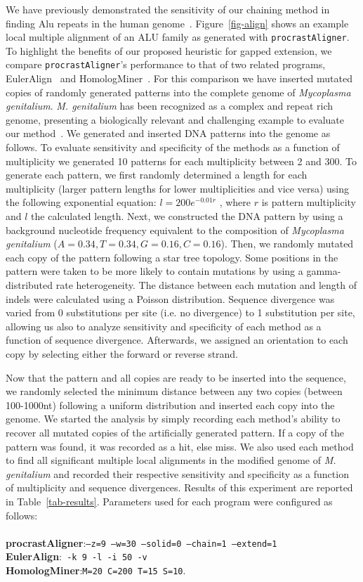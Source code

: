 \documentclass{ws-procs9x6}
\begin{document}
We have previously demonstrated the sensitivity of our chaining method in finding Alu repeats in
the human genome~\cite{ref-procrast}. Figure~\ref{fig-align} shows an example local multiple alignment of an ALU family as generated with \texttt{procrastAligner}. To highlight the benefits of our proposed heuristic for gapped extension, we compare \texttt{procrastAligner}'s performance to that of two related programs, EulerAlign~\cite{ref-related1} and HomologMiner~\cite{ref-homologminer}. For this comparison we have inserted mutated copies of randomly generated patterns into the complete genome of \emph{Mycoplasma genitalium}. \emph{M. genitalium} has been recognized as a complex and repeat rich genome, presenting a biologically relevant and challenging example to evaluate our method~\cite{ref-mycoplasma}. We generated and inserted DNA patterns into the genome as follows. To evaluate sensitivity and specificity of the methods as a function of multiplicity we generated 10 patterns for each multiplicity between 2 and 300. To generate each pattern, we first randomly determined a length for each multiplicity (larger pattern lengths for lower multiplicities and vice versa) using the following exponential equation: $l = 200e^{-0.01r}$ , where $r$ is pattern multiplicity and $l$ the calculated length. Next, we constructed the DNA pattern by using a background nucleotide frequency equivalent to the composition of \emph{Mycoplasma genitalium} ($A=0.34,T=0.34,G=0.16,C=0.16$). Then, we randomly mutated each copy of the pattern following a star tree topology. Some positions in the pattern were taken to be more likely to contain mutations by using a gamma-distributed rate heterogeneity. The distance between each mutation and length of indels were calculated using a Poisson distribution. Sequence divergence was varied from 0 substitutions per site (i.e. no divergence) to 1 substitution per site, allowing us also to analyze sensitivity and specificity of each method as a function of sequence divergence. Afterwards, we assigned an orientation to each copy by selecting either the forward or reverse strand.

Now that the pattern and all copies are ready to be inserted into the sequence, we randomly selected the minimum distance between any two copies (between 100-1000nt) following a uniform distribution and inserted each copy into the genome.  We started the analysis by simply recording each method's ability to recover all mutated copies of the  artificially generated pattern. If a copy of the pattern was found, it was recorded as a hit, else miss. We also used each method to find all significant multiple local alignments in the modified genome of \emph{M. genitalium} and recorded their respective sensitivity and specificity as a function of multiplicity and sequence divergences. Results of this experiment are reported in Table~\ref{tab-results}. Parameters used for each program were configured as follows: \\ \\ \textbf{procrastAligner}:\texttt{--z=9 --w=30 --solid=0 --chain=1 --extend=1}\\ \textbf{EulerAlign}:\texttt{ -k 9 -l -i 50 -v} \\ \textbf{HomologMiner}:\texttt{M=20 C=200 T=15 S=10}.
\end{document}
